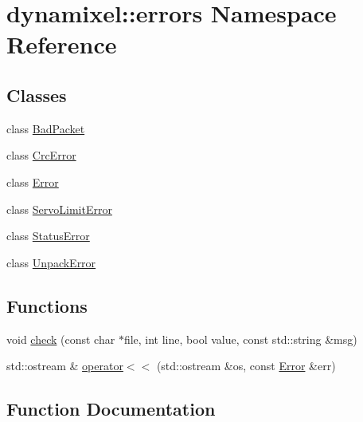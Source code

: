 \hypertarget{namespacedynamixel_1_1errors}{}\section{dynamixel\+:\+:errors Namespace Reference}
\label{namespacedynamixel_1_1errors}
\subsection*{Classes}
\begin{DoxyCompactItemize}
\item 
class \hyperlink{classdynamixel_1_1errors_1_1_bad_packet}{Bad\+Packet}
\item 
class \hyperlink{classdynamixel_1_1errors_1_1_crc_error}{Crc\+Error}
\item 
class \hyperlink{classdynamixel_1_1errors_1_1_error}{Error}
\item 
class \hyperlink{classdynamixel_1_1errors_1_1_servo_limit_error}{Servo\+Limit\+Error}
\item 
class \hyperlink{classdynamixel_1_1errors_1_1_status_error}{Status\+Error}
\item 
class \hyperlink{classdynamixel_1_1errors_1_1_unpack_error}{Unpack\+Error}
\end{DoxyCompactItemize}
\subsection*{Functions}
\begin{DoxyCompactItemize}
\item 
void \hyperlink{namespacedynamixel_1_1errors_a8ce9eb21754f795d22794487c25d0b2d}{check} (const char $\ast$file, int line, bool value, const std\+::string \&msg)
\item 
std\+::ostream \& \hyperlink{namespacedynamixel_1_1errors_a214a77c7d6b433bdfe2ad7beec08d7f8}{operator$<$$<$} (std\+::ostream \&os, const \hyperlink{classdynamixel_1_1errors_1_1_error}{Error} \&err)
\end{DoxyCompactItemize}


\subsection{Function Documentation}
